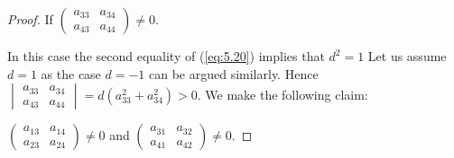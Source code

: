\documentclass[10pt,a4paper]{amsart}
\begin{document}
\begin{proof}
 If $\begin{pmatrix}a_{33} & a_{34} \\ a_{43} & a_{44} \end{pmatrix} \neq 0$.

In this case the second equality of (\ref{eq:5.20}) implies that $d^2=1$
Let us assume $d=1$ as the case $d=-1$ can be argued similarly. Hence $\begin{vmatrix}a_{33} & a_{34} \\ a_{43} & a_{44} \end{vmatrix} = d(a_{33}^2+a_{34}^2)>0$. We make the following claim:
\vspace{0.2cm}

  $\begin{pmatrix}a_{13} & a_{14} \\ a_{23} & a_{24} \end{pmatrix} \neq 0$
and $\begin{pmatrix}a_{31} & a_{32} \\ a_{41} & a_{42} \end{pmatrix} \neq 0$.


\end{proof}
\end{document}
